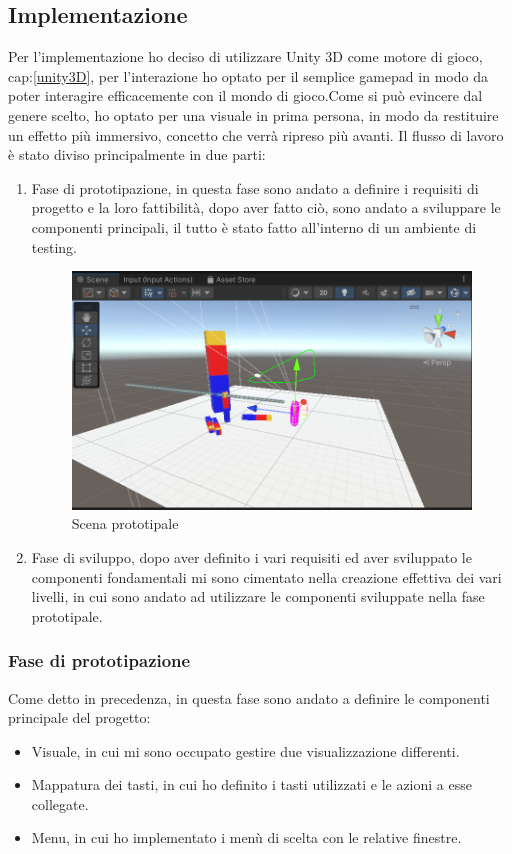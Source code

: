 \documentclass[10pt,a4paper]{article}
\begin{document}
    \subsection{Implementazione}
    Per l'implementazione ho deciso di utilizzare Unity 3D come motore di gioco, cap:\ref{unity3D}, per l'interazione ho optato per il semplice gamepad in modo da poter interagire efficacemente con il mondo di gioco.Come si può evincere dal genere scelto, ho optato per una visuale in prima persona, in modo da restituire un effetto più immersivo, concetto che verrà ripreso più avanti.
    Il flusso di lavoro è stato diviso principalmente in due parti:
    \begin{enumerate}
        \item Fase di prototipazione, in questa fase sono andato a definire i requisiti di progetto e la loro fattibilità, dopo aver fatto ciò, sono andato a sviluppare le componenti principali, il tutto è stato fatto all'interno di un ambiente di testing.
        \begin{figure}[H]
        	\centering
        	\includegraphics[width=0.8\linewidth]{image/protot}
        	\caption{Scena prototipale}
        	\label{fig:protot}
        \end{figure}
        \item Fase di sviluppo, dopo aver definito i vari requisiti ed aver sviluppato le componenti fondamentali mi sono cimentato nella creazione effettiva dei vari livelli, in cui sono andato ad utilizzare le componenti sviluppate nella fase prototipale.
    \end{enumerate}
    \subsubsection{Fase di prototipazione}
     Come detto in precedenza, in questa fase sono andato a definire le componenti principale del progetto:
     \begin{itemize}
     	\item Visuale, in cui mi sono occupato gestire due visualizzazione differenti.
     	\item Mappatura dei tasti, in cui ho definito i tasti utilizzati e le azioni a esse collegate.
     	\item Menu, in cui ho implementato i menù di scelta con le relative finestre.
     \end{itemize}
  
\end{document}
